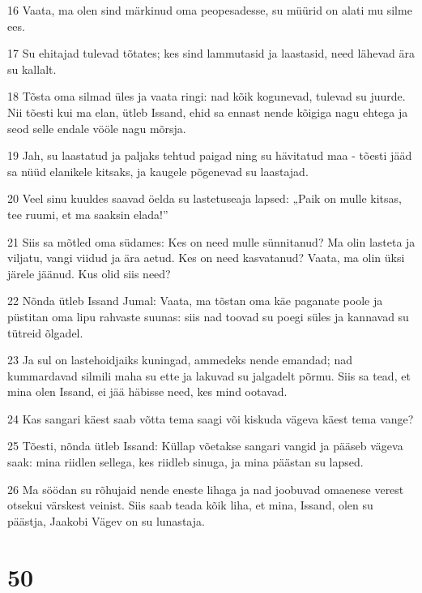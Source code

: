 \par 16 Vaata, ma olen sind märkinud oma peopesadesse, su müürid on alati mu silme ees.
\par 17 Su ehitajad tulevad tõtates; kes sind lammutasid ja laastasid, need lähevad ära su kallalt.
\par 18 Tõsta oma silmad üles ja vaata ringi: nad kõik kogunevad, tulevad su juurde. Nii tõesti kui ma elan, ütleb Issand, ehid sa ennast nende kõigiga nagu ehtega ja seod selle endale vööle nagu mõrsja.
\par 19 Jah, su laastatud ja paljaks tehtud paigad ning su hävitatud maa - tõesti jääd sa nüüd elanikele kitsaks, ja kaugele põgenevad su laastajad.
\par 20 Veel sinu kuuldes saavad öelda su lastetuseaja lapsed: „Paik on mulle kitsas, tee ruumi, et ma saaksin elada!”
\par 21 Siis sa mõtled oma südames: Kes on need mulle sünnitanud? Ma olin lasteta ja viljatu, vangi viidud ja ära aetud. Kes on need kasvatanud? Vaata, ma olin üksi järele jäänud. Kus olid siis need?
\par 22 Nõnda ütleb Issand Jumal: Vaata, ma tõstan oma käe paganate poole ja püstitan oma lipu rahvaste suunas: siis nad toovad su poegi süles ja kannavad su tütreid õlgadel.
\par 23 Ja sul on lastehoidjaiks kuningad, ammedeks nende emandad; nad kummardavad silmili maha su ette ja lakuvad su jalgadelt põrmu. Siis sa tead, et mina olen Issand, ei jää häbisse need, kes mind ootavad.
\par 24 Kas sangari käest saab võtta tema saagi või kiskuda vägeva käest tema vange?
\par 25 Tõesti, nõnda ütleb Issand: Küllap võetakse sangari vangid ja pääseb vägeva saak: mina riidlen sellega, kes riidleb sinuga, ja mina päästan su lapsed.
\par 26 Ma söödan su rõhujaid nende eneste lihaga ja nad joobuvad omaenese verest otsekui värskest veinist. Siis saab teada kõik liha, et mina, Issand, olen su päästja, Jaakobi Vägev on su lunastaja.

\chapter{50}


